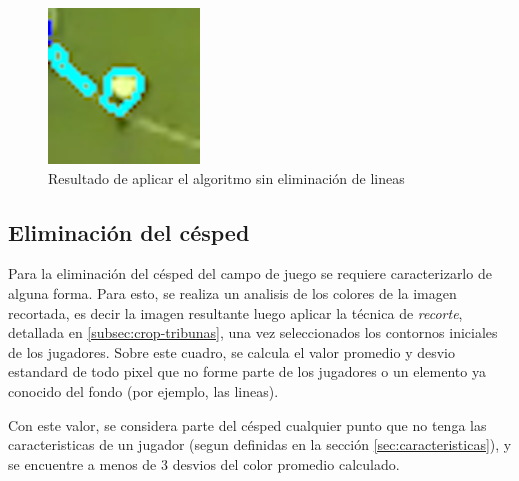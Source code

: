 \begin{figure}[H]
  \centering
    \begin{minipage}[t]{.45\textwidth}
      \includegraphics[width=\linewidth]{./images/confusion-linea.png}
      \caption{Resultado de aplicar el algoritmo sin eliminación de lineas
      \label{fig:confusion-linea}}
    \end{minipage}
\end{figure}

\subsection{Eliminación del césped}
\label{sec:cesped}

Para la eliminación del césped del campo de juego se requiere caracterizarlo
de alguna forma. Para esto, se realiza un analisis de los colores de
la imagen recortada, es decir la imagen resultante luego aplicar la técnica
de \textit{recorte}, detallada en \ref{subsec:crop-tribunas}, una vez seleccionados
los contornos iniciales de los jugadores. Sobre este cuadro, se calcula el valor
promedio y desvio estandard de todo pixel que no forme parte de los jugadores o
un elemento ya conocido del fondo (por ejemplo, las lineas). 

Con este valor, se considera parte del césped cualquier punto que no tenga las
caracteristicas de un jugador (segun definidas en la sección \ref{sec:caracteristicas}),
y se encuentre a menos de 3 desvios del color promedio calculado.

